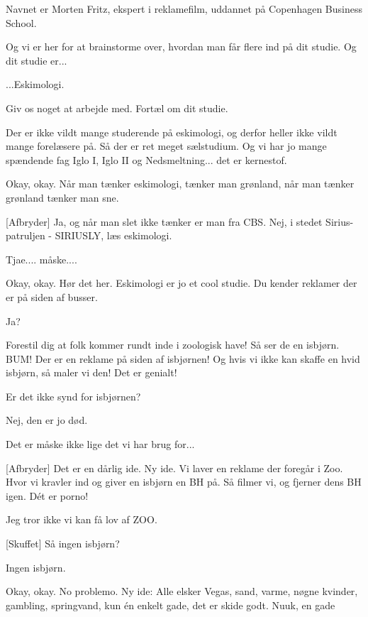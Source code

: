 \documentclass[a4paper,11pt]{article}
\begin{document}
\begin{sketch}


 Navnet er Morten Fritz, ekspert i reklamefilm, uddannet på Copenhagen Business School. 

 Og vi er her for at brainstorme over, hvordan man får flere ind på dit studie.  Og dit studie er... 

 ...Eskimologi.

 Giv os noget at arbejde med. Fortæl om dit studie.

 Der er ikke vildt mange studerende på eskimologi, og derfor heller ikke vildt mange forelæsere på. Så der er ret meget sælstudium. Og vi har jo mange spændende fag Iglo I, Iglo II og Nedsmeltning... det er kernestof.

 Okay, okay. Når man tænker eskimologi, tænker man grønland, når man tænker grønland tænker man sne.

[Afbryder] Ja, og når man slet ikke tænker er man fra CBS. Nej, i stedet Sirius-patruljen - SIRIUSLY, læs eskimologi.

 Tjae.... måske....

 Okay, okay. Hør det her. Eskimologi er jo et cool studie. Du kender reklamer der er på siden af busser.

 Ja?

 Forestil dig at folk kommer rundt inde i zoologisk have! Så ser de en isbjørn. BUM! Der er en reklame på siden af isbjørnen! Og hvis vi ikke kan skaffe en hvid isbjørn, så maler vi den! Det er genialt!

 Er det ikke synd for isbjørnen?

 Nej, den er jo død.

 Det er måske ikke lige det vi har brug for...

[Afbryder] Det er en dårlig ide. Ny ide. Vi laver en reklame der foregår i Zoo. Hvor vi kravler ind og giver en isbjørn en BH på. Så filmer vi, og fjerner dens BH igen. Dét er porno!

 Jeg tror ikke vi kan få lov af ZOO.

[Skuffet] Så ingen isbjørn?

 Ingen isbjørn.

 Okay, okay. No problemo. Ny ide: Alle elsker Vegas, sand, varme, nøgne kvinder, gambling, springvand, kun én enkelt gade, det er skide godt. Nuuk, en gade


\end{sketch}
\end{document}
